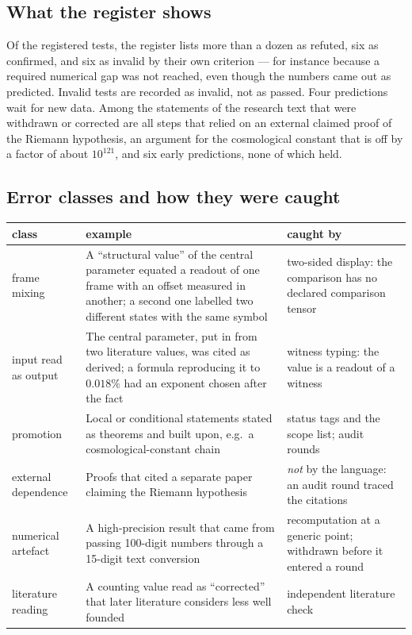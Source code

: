 \subsection{What the register shows}

Of the registered tests, the register lists more than a dozen as refuted, six as confirmed, and six as invalid by their own criterion ---
for instance because a required numerical gap was not reached, even though the numbers came out as predicted.  Invalid tests are recorded as
invalid, not as passed.  Four predictions wait for new data.  Among the statements of the research text that were withdrawn or corrected are
all steps that relied on an external claimed proof of the Riemann hypothesis, an argument for the cosmological constant that is off by a factor
of about \(10^{121}\), and six early predictions, none of which held.

\subsection{Error classes and how they were caught}

\begin{center}
\small
\renewcommand{\arraystretch}{1.3}
\begin{longtable}{@{}>{\raggedright\arraybackslash}p{}>{\raggedright\arraybackslash}p{}>{\raggedright\arraybackslash}p{}@{}}
\toprule
class & example & caught by\\
\midrule
\endhead
frame mixing & A ``structural value'' of the central parameter equated a readout of one frame with an offset measured in another; a
second one labelled two different states with the same symbol & two-sided display: the comparison has no declared comparison tensor\\
input read as output & The central parameter, put in from two literature values, was cited as derived; a formula reproducing it to
\(0.018\%\) had an exponent chosen after the fact & witness typing: the value is a readout of a witness\\
promotion & Local or conditional statements stated as theorems and built upon, e.g.\ a cosmological-constant chain & status tags and the scope
list; audit rounds\\
external dependence & Proofs that cited a separate paper claiming the Riemann hypothesis & \emph{not} by the language: an audit round traced
the citations\\
numerical artefact & A high-precision result that came from passing 100-digit numbers through a 15-digit text conversion & recomputation at a
generic point; withdrawn before it entered a round\\
literature reading & A counting value read as ``corrected'' that later literature considers less well founded & independent literature check\\
\bottomrule
\end{longtable}
\end{center}

